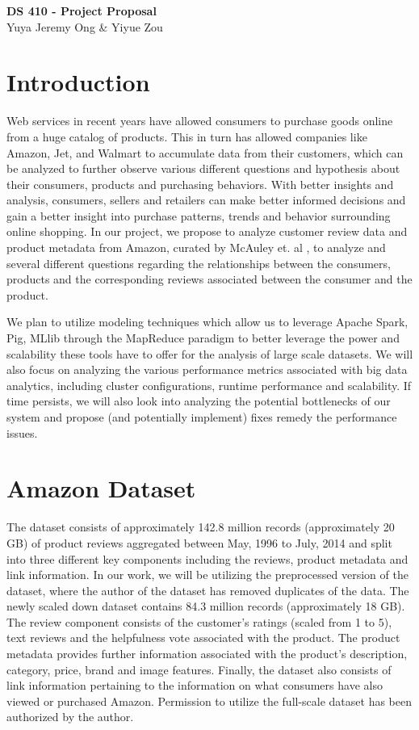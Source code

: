 \documentclass[a4paper, 11pt]{article}
\begin{document}
\noindent
\large\textbf{DS 410 - Project Proposal} \\
\normalsize Yuya Jeremy Ong \& Yiyue Zou \\

\section*{Introduction}
Web services in recent years have allowed consumers to purchase goods online from a huge catalog of products. This in turn has allowed companies like Amazon, Jet, and Walmart to accumulate data from their customers, which can be analyzed to further observe various different questions and hypothesis about their consumers, products and purchasing behaviors. With better insights and analysis, consumers, sellers and retailers can make better informed decisions and gain a better insight into purchase patterns, trends and behavior surrounding online shopping. In our project, we propose to analyze customer review data and product metadata from Amazon, curated by McAuley et. al \cite{McAuley_SIGR15, McAuley_KDD15}, to analyze and several different questions regarding the relationships between the consumers, products and the corresponding reviews associated between the consumer and the product. 

We plan to utilize modeling techniques which allow us to leverage Apache Spark, Pig, MLlib through the MapReduce paradigm to better leverage the power and scalability these tools have to offer for the analysis of large scale datasets. We will also focus on analyzing the various performance metrics associated with big data analytics, including cluster configurations, runtime performance and scalability. If time persists, we will also look into analyzing the potential bottlenecks of our system and propose (and potentially implement) fixes remedy the performance issues.

\section*{Amazon Dataset}
The dataset consists of approximately 142.8 million records (approximately 20 GB) of product reviews aggregated between May, 1996 to July, 2014 and split into three different key components including the reviews, product metadata and link information. In our work, we will be utilizing the preprocessed version of the dataset, where the author of the dataset has removed duplicates of the data. The newly scaled down dataset contains 84.3 million records (approximately 18 GB). The review component consists of the customer's ratings (scaled from 1 to 5), text reviews and the helpfulness vote associated with the product. The product metadata provides further information associated with the product's description, category, price, brand and image features. Finally, the dataset also consists of link information pertaining to the information on what consumers have also viewed or purchased Amazon. Permission to utilize the full-scale dataset has been authorized by the author.
\end{document}
